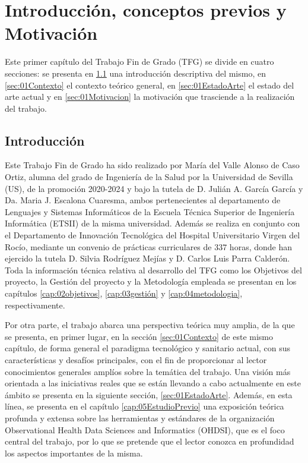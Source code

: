 \chapter{Introducción, conceptos previos y Motivación}\label{cap:introduccion}

Este primer capítulo del Trabajo Fin de Grado (TFG) se divide en cuatro secciones: se presenta en \ref{sec:01Intro} una introducción descriptiva del mismo, en \ref{sec:01Contexto} el contexto teórico general, en \ref{sec:01EstadoArte} el estado del arte actual y en \ref{sec:01Motivacion} la motivación que trasciende a la realización del trabajo.

\section{Introducción} \label{sec:01Intro}

Este Trabajo Fin de Grado ha sido realizado por María del Valle Alonso de Caso Ortiz, alumna del grado de Ingeniería de la Salud por la Universidad de Sevilla (US), de la promoción 2020-2024 y bajo la tutela de D. Julián A. García García y Da. Maria J. Escalona Cuaresma, ambos pertenecientes al departamento de Lenguajes y Sistemas Informáticos de la Escuela Técnica Superior de Ingeniería Informática (ETSII) de la misma universidad. Además se realiza en conjunto con el Departamento de Innovación Tecnológica del Hospital Universitario Virgen del Rocío, mediante un convenio de prácticas curriculares de 337 horas, donde han ejercido la tutela D. Silvia Rodríguez Mejías y D. Carlos Luis Parra Calderón. Toda la información técnica relativa al desarrollo del TFG como los Objetivos del proyecto, la Gestión del proyecto y la Metodología empleada se presentan en los capítulos \ref{cap:02objetivos}, \ref{cap:03gestión} y \ref{cap:04metodologia}, respectivamente.

Por otra parte, el trabajo abarca una perspectiva teórica muy amplia, de la que se presenta, en primer lugar, en la sección \ref{sec:01Contexto} de este mismo capítulo, de forma general el paradigma tecnológico y sanitario actual, con sus características y desafíos principales, con el fin de proporcionar al lector conocimientos generales amplíos sobre la temática del trabajo. Una visión más orientada a las iniciativas reales que se están llevando a cabo actualmente en este ámbito se presenta en la siguiente sección, \ref{sec:01EstadoArte}. Además, en esta línea, se presenta en el capítulo \ref{cap:05EstudioPrevio} una exposición teórica profunda y extensa sobre las herramientas y estándares de la organización Observational Health Data Sciences and Informatics (OHDSI), que es el foco central del trabajo, por lo que se pretende que el lector conozca en profundidad los aspectos importantes de la misma.

